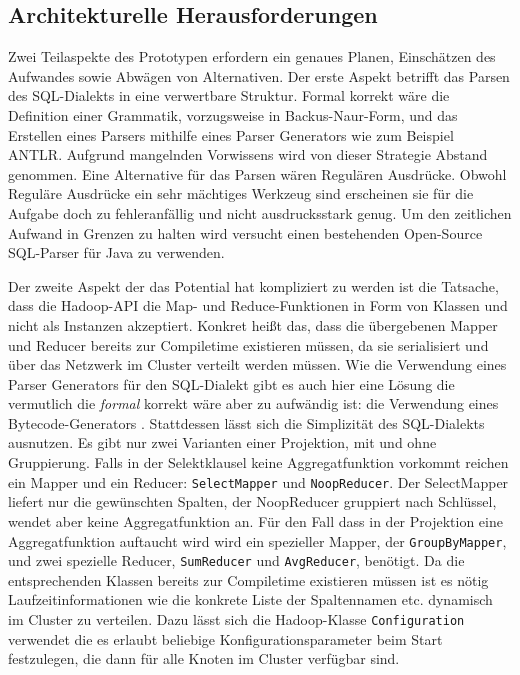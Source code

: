 \documentclass[a4paper]{article}
\begin{document}
\subsection{Architekturelle Herausforderungen}
\label{sec:challenges}
Zwei Teilaspekte des Prototypen erfordern ein genaues Planen, Einschätzen des Aufwandes sowie Abwägen von Alternativen. Der erste Aspekt betrifft das Parsen des SQL-Dialekts in eine verwertbare Struktur. Formal korrekt wäre die Definition einer Grammatik, vorzugsweise in Backus-Naur-Form, und das Erstellen eines Parsers mithilfe eines Parser Generators wie zum Beispiel ANTLR. Aufgrund mangelnden Vorwissens wird von dieser Strategie Abstand genommen. Eine Alternative für das Parsen wären Regulären Ausdrücke. Obwohl Reguläre Ausdrücke ein sehr mächtiges Werkzeug sind erscheinen sie für die Aufgabe doch zu fehleranfällig und nicht ausdrucksstark genug. Um den zeitlichen Aufwand in Grenzen zu halten wird versucht einen bestehenden Open-Source SQL-Parser \cite{SQLParser} für Java zu verwenden.

Der zweite Aspekt der das Potential hat kompliziert zu werden ist die Tatsache, dass die Hadoop-API die Map- und Reduce-Funktionen in Form von Klassen und nicht als Instanzen akzeptiert. Konkret heißt das, dass die übergebenen Mapper und Reducer bereits zur Compiletime existieren müssen, da sie serialisiert und über das Netzwerk im Cluster verteilt werden müssen. Wie die Verwendung eines Parser Generators für den SQL-Dialekt gibt es auch hier eine Lösung die vermutlich die \textit{formal} korrekt wäre aber zu aufwändig ist: die Verwendung eines Bytecode-Generators \cite{Bytecode}. Stattdessen lässt sich die Simplizität des SQL-Dialekts ausnutzen. Es gibt nur zwei Varianten einer Projektion, mit und ohne Gruppierung. Falls in der Selektklausel keine Aggregatfunktion vorkommt reichen ein Mapper und ein Reducer: \texttt{SelectMapper} und \texttt{NoopReducer}. Der SelectMapper liefert nur die gewünschten Spalten, der NoopReducer gruppiert nach Schlüssel, wendet aber keine Aggregatfunktion an. Für den Fall dass in der Projektion eine Aggregatfunktion auftaucht wird wird ein spezieller Mapper, der \texttt{GroupByMapper}, und zwei spezielle Reducer, \texttt{SumReducer} und \texttt{AvgReducer}, benötigt. Da die entsprechenden Klassen bereits zur Compiletime existieren müssen ist es nötig Laufzeitinformationen wie die konkrete Liste der Spaltennamen etc. dynamisch im Cluster zu verteilen. Dazu lässt sich die Hadoop-Klasse \texttt{Configuration} verwendet die es erlaubt beliebige Konfigurationsparameter beim Start festzulegen, die dann für alle Knoten im Cluster verfügbar sind.
\end{document}
